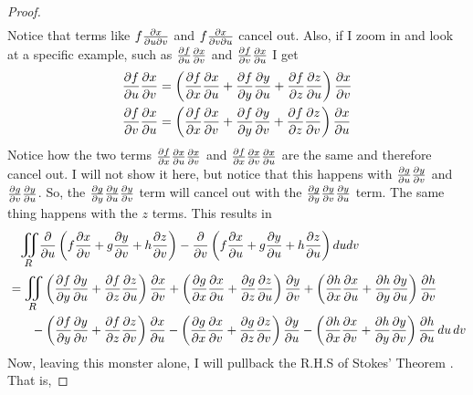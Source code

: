 \documentclass[titlepage]{article}
\begin{document}
\begin{proof}
\begin{align*}
\end{align*}
Notice that terms like $f\frac{\partial x}{\partial u \partial v}$ and $f\frac{\partial x}{\partial v \partial u}$ cancel out. Also, if I zoom in and look at a specific example, such as $\frac{\partial f}{\partial u} \frac{\partial x}{\partial v}$ and $\frac{\partial f}{\partial v} \frac{\partial x}{\partial u}$ I get
\begin{align*}
\frac{\partial f}{\partial u} \frac{\partial x}{\partial v} &= \left( \frac{\partial f}{\partial x} \frac{\partial x}{\partial u} + \frac{\partial f}{\partial y} \frac{\partial y}{\partial u} +\frac{\partial f}{\partial z} \frac{\partial z}{\partial u} \right) \frac{\partial x}{\partial v}\\
\frac{\partial f}{\partial v} \frac{\partial x}{\partial u} &=  \left( \frac{\partial f}{\partial x} \frac{\partial x}{\partial v} + \frac{\partial f}{\partial y} \frac{\partial y}{\partial v} +\frac{\partial f}{\partial z} \frac{\partial z}{\partial v} \right) \frac{\partial x}{\partial u}\\
\end{align*}
Notice how the two terms $\frac{\partial f}{\partial x} \frac{\partial x}{\partial u} \frac{\partial x}{\partial v}$ and $\frac{\partial f}{\partial x} \frac{\partial x}{\partial v} \frac{\partial x}{\partial u}$ are the same and therefore cancel out. I will not show it here, but notice that this happens with $\frac{\partial g}{\partial u}\frac{\partial y}{\partial v}$ and $\frac{\partial g}{\partial v}\frac{\partial y}{\partial u}$. So, the $\frac{\partial g}{\partial y} \frac{\partial y}{\partial u} \frac{\partial y}{\partial v}$ term will cancel out with the $\frac{\partial g}{\partial y} \frac{\partial y}{\partial v} \frac{\partial y}{\partial u}$ term. The same thing happens with the $z$ terms. This results in
\begin{align*}
 &\quad\bigiint{R}{} \frac{\p}{\p u} \left(  f\frac{\p x}{\p v} + g\frac{\p y}{\p v} + h\frac{\p z}{\p v} \right) - \frac{\p }{\p v} \left( f\frac{\p x}{\p u} + g\frac{\p y}{\p u} + h\frac{\p z}{\p u}\right)dudv \\
 &= \bigiint{R}{}\left(\frac{\p f}{\p y} \frac{\p y}{\p u} + \frac{\p f}{\p z} \frac{\p z}{\p u}\right)\frac{\p x}{\p v} +  \left(\frac{\p g}{\p x} \frac{\p x}{\p u} + \frac{\p g}{\p z} \frac{\p z}{\p u}\right)\frac{\p y}{\p v}  +  \left(\frac{\p h}{\p x} \frac{\p x}{\p u} + \frac{\p h}{\p y} \frac{\p y}{\p u}\right)\frac{\p h}{\p v} \\
 &\quad\quad \hspace{-.15em}-\left(\frac{\p f}{\p y} \frac{\p y}{\p v} + \frac{\p f}{\p z} \frac{\p z}{\p v}\right)\frac{\p x}{\p u} -  \left(\frac{\p g}{\p x} \frac{\p x}{\p v} + \frac{\p g}{\p z} \frac{\p z}{\p v}\right)\frac{\p y}{\p u}  -  \left(\frac{\p h}{\p x} \frac{\p x}{\p v} + \frac{\p h}{\p y} \frac{\p y}{\p v}\right)\frac{\p h}{\p u} \,du\,dv
 \end{align*}
 Now, leaving this monster alone, I will pullback the R.H.S of Stokes' Theorem . That is,

\end{proof}
\end{document}

